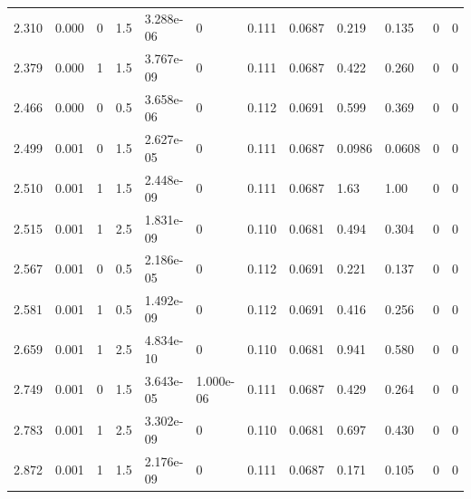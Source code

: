 \documentclass[preview]{standalone}
\begin{document}
{{\begin{tabular}{L{1.2cm}C{1.2cm} C{0.3cm}C{0.5cm} C{1.4cm}C{1.4cm} C{1.4cm}C{1.4cm} C{1.6cm}C{1.6cm} C{1.6cm}C{1.6cm}}
  2.310  &  0.000  & 0     & 1.5 &  3.288e-06  & 0  &  0.111&   0.0687& 0.219 & 0.135   &  0 & 0  \\ 
  2.379  &  0.000  & 1     & 1.5 &  3.767e-09  & 0  &  0.111&   0.0687& 0.422 & 0.260   &  0 & 0  \\ 
  2.466  &  0.000  & 0     & 0.5 &  3.658e-06  & 0  &  0.112&   0.0691& 0.599 & 0.369   &  0 & 0  \\ 
  2.499  &  0.001  & 0     & 1.5 &  2.627e-05  & 0  &  0.111&   0.0687& 0.0986 & 0.0608   &  0 & 0  \\ 
  2.510  &  0.001  & 1     & 1.5 &  2.448e-09  & 0  &  0.111&   0.0687& 1.63 & 1.00   &  0 & 0  \\ 
  2.515  &  0.001  & 1     & 2.5 &  1.831e-09  & 0  &  0.110&   0.0681& 0.494 & 0.304   &  0 & 0  \\ 
  2.567  &  0.001  & 0     & 0.5 &  2.186e-05  & 0  &  0.112&   0.0691& 0.221 & 0.137   &  0 & 0  \\ 
  2.581  &  0.001  & 1     & 0.5 &  1.492e-09  & 0  &  0.112&   0.0691& 0.416 & 0.256   &  0 & 0  \\ 
  2.659  &  0.001  & 1     & 2.5 &  4.834e-10  & 0  &  0.110&   0.0681& 0.941 & 0.580   &  0 & 0  \\ 
  2.749  &  0.001  & 0     & 1.5 &  3.643e-05  & 1.000e-06  &  0.111&   0.0687& 0.429 & 0.264   &  0 & 0  \\ 
  2.783  &  0.001  & 1     & 2.5 &  3.302e-09  & 0  &  0.110&   0.0681& 0.697 & 0.430   &  0 & 0  \\ 
  2.872  &  0.001  & 1     & 1.5 &  2.176e-09  & 0  &  0.111&   0.0687& 0.171 & 0.105   &  0 & 0  \\ 
\hline 
\end{tabular} 

}}
\end{document}
